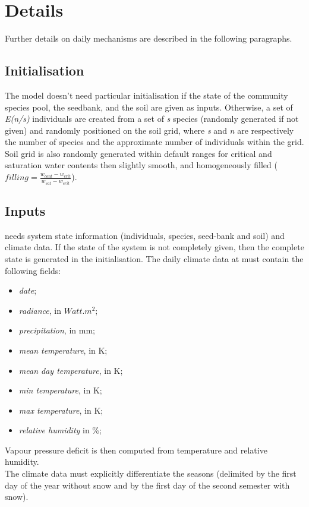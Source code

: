 \section{Details}

Further details on daily mechanisms are described in the following paragraphs.

%

\subsection{Initialisation}
The model doesn't need particular initialisation if the state of the community species pool, the seedbank, and the soil are given as inputs. Otherwise, a set of \textit{E(n/s)} individuals are created from a set of \textit{s} species (randomly generated if not given) and randomly positioned on the soil grid, where \textit{s} and \textit{n} are respectively the number of species and the approximate number of individuals within the grid. Soil grid is also randomly generated within default ranges for critical and saturation water contents then slightly smooth, and homogeneously filled ($filling = \frac{w_{cont} - w_{crit}}{w_{sat} - w_{crit}}$).
 
\subsection{Inputs}
\model needs system state information (individuals, species, seed-bank and soil) and climate data. If the state of the system is not completely given, then the complete state is generated in the initialisation. The daily climate data at must contain the following fields:
\begin{itemize}
\setlength\itemsep{0em}
\item \textit{date};
\item \textit{radiance}, in $Watt.m^{2}$;
\item \textit{precipitation}, in mm;
\item \textit{mean temperature}, in K;
\item \textit{mean day temperature}, in K;
\item \textit{min temperature}, in K;
\item \textit{max temperature}, in K;
\item \textit{relative humidity} in \%;
\end{itemize}
Vapour pressure deficit is then computed from temperature and relative humidity.\\
\indent The climate data must explicitly differentiate the seasons (delimited by the first day of the year without snow and by the first day of the second semester with snow).

